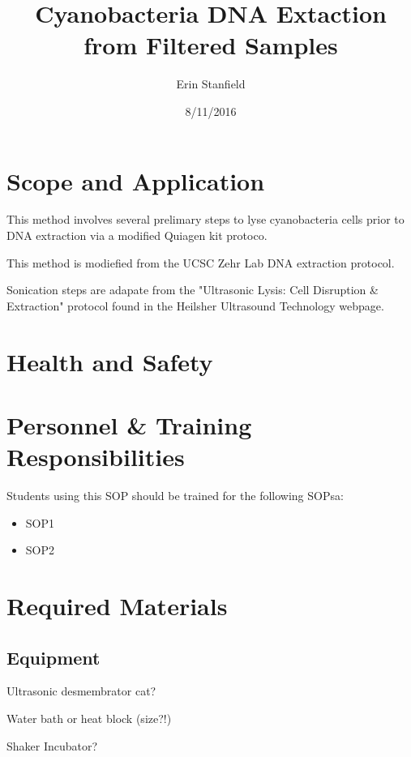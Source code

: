 \documentclass[12pt]{../SOP2}
\title{Cyanobacteria DNA Extaction from Filtered Samples}
\date{8/11/2016}
\author{Erin Stanfield}
\begin{document}


\maketitle

\section{Scope and Application}

\NP This method involves several prelimary steps to lyse cyanobacteria cells prior to DNA extraction via a modified Quiagen kit protoco.

\NP This method is modiefied from the UCSC Zehr Lab DNA extraction protocol.

\NP Sonication steps are adapate from the "Ultrasonic Lysis: Cell Disruption \& Extraction" protocol found in the Heilsher Ultrasound Technology webpage.

\section{Health and Safety}

\NP \lipsum[2]


\section{Personnel \& Training Responsibilities}

\NP \lipsum[1]

Students using this SOP should be trained for the following SOPsa:

\begin{itemize}
  \item SOP1
  \item SOP2
\end{itemize}


\section{Required Materials}

\subsection{Equipment}

\NP Ultrasonic desmembrator cat?

\NP Water bath or heat block (size?!)

\NP Shaker Incubator?
\end{document}
